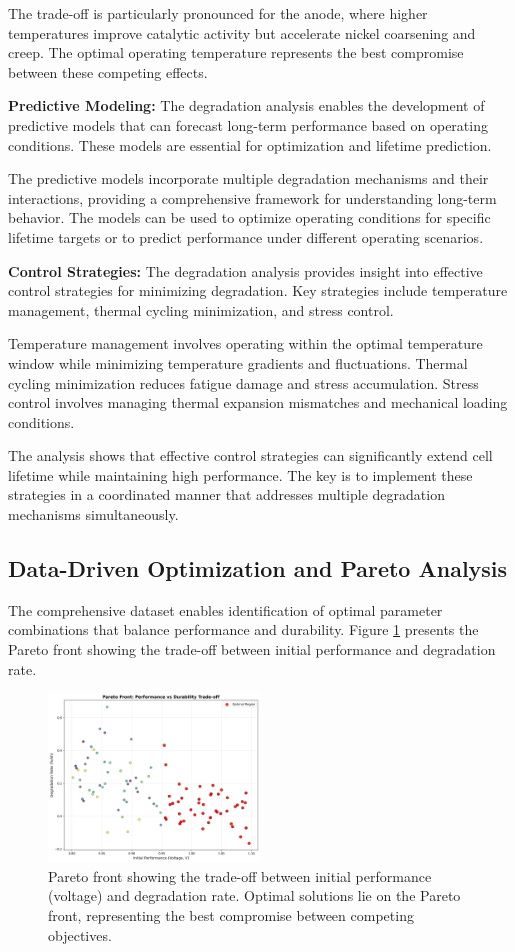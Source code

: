 \documentclass[conference]{IEEEtran}
\begin{document}
The trade-off is particularly pronounced for the anode, where higher temperatures improve catalytic activity but accelerate nickel coarsening and creep. The optimal operating temperature represents the best compromise between these competing effects.

\textbf{Predictive Modeling:} The degradation analysis enables the development of predictive models that can forecast long-term performance based on operating conditions. These models are essential for optimization and lifetime prediction.

The predictive models incorporate multiple degradation mechanisms and their interactions, providing a comprehensive framework for understanding long-term behavior. The models can be used to optimize operating conditions for specific lifetime targets or to predict performance under different operating scenarios.

\textbf{Control Strategies:} The degradation analysis provides insight into effective control strategies for minimizing degradation. Key strategies include temperature management, thermal cycling minimization, and stress control.

Temperature management involves operating within the optimal temperature window while minimizing temperature gradients and fluctuations. Thermal cycling minimization reduces fatigue damage and stress accumulation. Stress control involves managing thermal expansion mismatches and mechanical loading conditions.

The analysis shows that effective control strategies can significantly extend cell lifetime while maintaining high performance. The key is to implement these strategies in a coordinated manner that addresses multiple degradation mechanisms simultaneously.

\subsection{Data-Driven Optimization and Pareto Analysis}

The comprehensive dataset enables identification of optimal parameter combinations that balance performance and durability. Figure \ref{fig:pareto_front} presents the Pareto front showing the trade-off between initial performance and degradation rate.

\begin{figure}[htbp]
\centering
\includegraphics[width=0.5\textwidth]{pareto_front.png}
\caption{Pareto front showing the trade-off between initial performance (voltage) and degradation rate. Optimal solutions lie on the Pareto front, representing the best compromise between competing objectives.}
\label{fig:pareto_front}
\end{figure}
\end{document}
